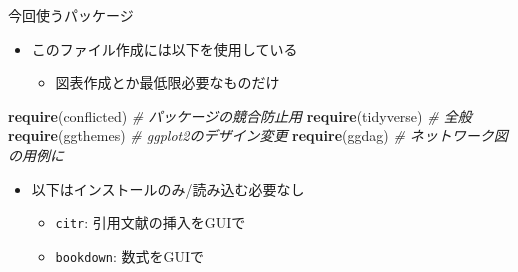 \documentclass[
  12pt,
  ignorenonframetext,
]{beamer}
\newenvironment{Shaded}{\begin{snugshade}}{\end{snugshade}}
\newcommand{\CommentTok}[1]{\textcolor[rgb]{0.56,0.35,0.01}{\textit{#1}}}
\newcommand{\KeywordTok}[1]{\textcolor[rgb]{0.13,0.29,0.53}{\textbf{#1}}}
\newcommand{\NormalTok}[1]{#1}
\providecommand{\tightlist}{%
  \setlength{\itemsep}{0pt}\setlength{\parskip}{0pt}}
\begin{document}
\begin{frame}[fragile]{今回使うパッケージ}
\protect\hypertarget{ux4ecaux56deux4f7fux3046ux30d1ux30c3ux30b1ux30fcux30b8}{}

\begin{itemize}
\tightlist
\item
  このファイル作成には以下を使用している

  \begin{itemize}
  \tightlist
  \item
    図表作成とか最低限必要なものだけ
  \end{itemize}
\end{itemize}

\begin{Shaded}
\begin{Highlighting}[numbers=left,,]
\KeywordTok{require}\NormalTok{(conflicted) }\CommentTok{# パッケージの競合防止用}
\KeywordTok{require}\NormalTok{(tidyverse)  }\CommentTok{# 全般}
\KeywordTok{require}\NormalTok{(ggthemes)   }\CommentTok{# ggplot2のデザイン変更}
\KeywordTok{require}\NormalTok{(ggdag)      }\CommentTok{# ネットワーク図の用例に}
\end{Highlighting}
\end{Shaded}

\begin{itemize}
\tightlist
\item
  以下はインストールのみ/読み込む必要なし

  \begin{itemize}
  \tightlist
  \item
    \texttt{citr}: 引用文献の挿入をGUIで
  \item
    \texttt{bookdown}: 数式をGUIで
  \end{itemize}
\end{itemize}

\end{frame}
\end{document}
